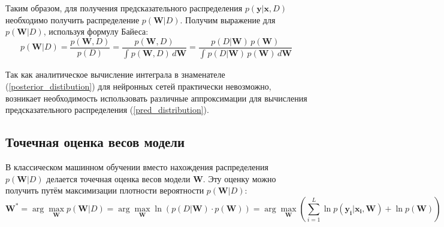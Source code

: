 \documentclass{article}
\newcommand{\argmax}{\arg\!\max}
\numberwithin{equation}{section}
\begin{document}
    Таким образом, для получения предсказательного распределения $p(\pmb{y} | \pmb{x}, D)$
    необходимо получить распределение $p(\pmb{W}| D)$.
    Получим выражение для $p(\pmb{W}| D)$, используя формулу Байеса:
    \begin{equation}\label{posterior_distibution}
        p(\pmb{W}| D)
        =
        \frac
            {p(\pmb{W}, D)}
            {p(D)}
        =
        \frac
            {p(\pmb{W}, D)}
            {
                \int_{}{
                    p(\pmb{W}, D)
                    \,
                    d\pmb{W}
                }
            }
        =
        \frac
            {
                p(D | \pmb{W})
                \,
                p(\pmb{W})
            }
            {
                \int_{}{
                    p(D | \pmb{W})
                    \,
                    p(\pmb{W})
                    \,
                    d\pmb{W}
                }
            }
    \end{equation}

    Так как аналитическое вычисление интеграла в знаменателе (\ref{posterior_distibution})
    для нейронных сетей практически невозможно, возникает необходимость использовать различные аппроксимации
    для вычисления предсказательного распределения (\ref{pred_distribution}).

    \subsection{Точечная оценка весов модели}
    В классическом машинном обучении вместо нахождения распределения $p(\pmb{W}| D)$
    делается точечная оценка весов модели $\pmb{W}$.
    Эту оценку можно получить путём максимизации плотности вероятности $p(\pmb{W}| D)$:
    \begin{equation}\label{max_posterior}
        \pmb{W}^*
        =
        \argmax_{\pmb{W}}{
            p(\pmb{W} | D)
        }
        =
        \argmax_{\pmb{W}}{
            \ln{
                (
                    p(D | \pmb{W})
                    \cdot
                    p(\pmb{W})
                )
            }
        }
        =
        \argmax_{\pmb{W}} {
            (
                \sum_{i=1}^{L}{
                    \ln{
                        p(\pmb{y_{i}} | \pmb{x_{i}}, \pmb{W})
                    }
                }
                +
                \ln{p(\pmb{W})}
            )
        }
    \end{equation}
\end{document}
